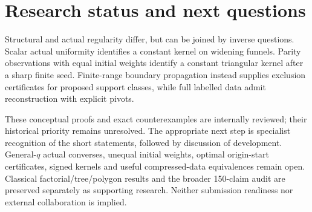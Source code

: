 \section{Research status and next questions}
Structural and actual regularity differ, but can be joined by inverse questions. Scalar actual uniformity identifies a constant kernel on widening funnels. Parity observations with equal initial weights identify a constant triangular kernel after a sharp finite seed. Finite-range boundary propagation instead supplies exclusion certificates for proposed support classes, while full labelled data admit reconstruction with explicit pivots.

These conceptual proofs and exact counterexamples are internally reviewed; their historical priority remains unresolved. The appropriate next step is specialist recognition of the short statements, followed by discussion of development. General-$q$ actual converses, unequal initial weights, optimal origin-start certificates, signed kernels and useful compressed-data equivalences remain open. Classical factorial/tree/polygon results and the broader 150-claim audit are preserved separately as supporting research. Neither submission readiness nor external collaboration is implied.
